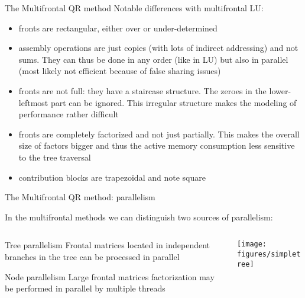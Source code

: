 \documentclass{beamer}
\newcommand{\db}[1]{\textcolor{amblu}{#1}}
\begin{document}
\begin{frame}{The Multifrontal QR method}
  Notable differences with multifrontal LU:
  \begin{itemize}
  \item \db{fronts are rectangular}, either over or under-determined
  \item \db{assembly operations are just copies} (with lots of indirect
    addressing) and not sums. They can thus be done in any order (like
    in LU) but also in parallel (most likely not efficient because of
    false sharing issues)
  \item \db{fronts are not full}: they have a staircase structure. The
    zeroes in the lower-leftmost part can be ignored. This irregular
    structure makes the modeling of performance rather difficult
  \item \db{fronts are completely factorized} and not just partially. This
    makes the overall size of factors bigger and thus the active
    memory consumption less sensitive to the tree traversal
  \item \db{contribution blocks are trapezoidal} and note square
  \end{itemize}

\end{frame}

\begin{frame}{The Multifrontal QR method: parallelism}

  In the multifrontal methods we can distinguish two sources of
  parallelism:

  \vspace{0.2cm}

  \begin{columns}
    \begin{column}{0.5\textwidth}

      \begin{block}{Tree parallelism}
        Frontal matrices located in independent branches in the
        tree can be processed in parallel
      \end{block}
      
      \begin{block}{Node parallelism}
        Large frontal matrices factorization may be performed in parallel
        by multiple threads
      \end{block}
    \end{column}
    \begin{column}{0.5\textwidth}
      \begin{center}
        \texttt{[image: figures/simpletree]}
      \end{center}
    \end{column}
  \end{columns}

\end{frame}
\end{document}
